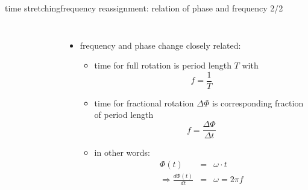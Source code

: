         \begin{frame}{time stretching}{frequency reassignment: relation of phase and frequency 2/2}

            \begin{columns}
            
            \begin{figure}
                \begin{tiny}
                \end{tiny}
            \end{figure}
            \begin{itemize}
                \item   frequency and phase change closely related:
                    \begin{itemize}
                        \item<2-> time for full rotation is period length $T$ with \[f = \frac{1}{T}\]
                        \item<3-> time for fractional rotation $\Delta\Phi$ is corresponding fraction of period length \[f = \frac{\Delta\Phi}{\Delta t}\]
                        \item<4-> in other words: 
                        \begin{eqnarray*}
                            \Phi(t) &=& \omega\cdot t\\
                            \Rightarrow \frac{d\Phi(t)}{dt} &=& \omega = 2\pi f
                        \end{eqnarray*}
                    \end{itemize}
            \end{itemize}
            \end{columns}
        \end{frame}
